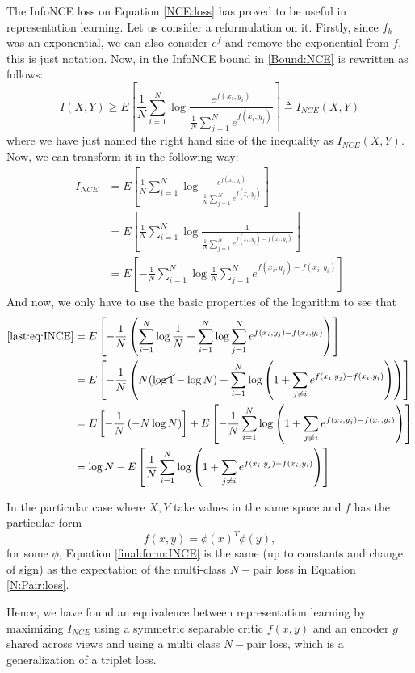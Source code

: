 The InfoNCE loss on Equation \eqref{NCE:loss} has proved to be useful in representation learning. Let us consider a reformulation on it. Firstly, since $f_k$ was an exponential, we can also consider $e^f$ and remove the exponential from $f$, this is just notation. Now, in \cite{poole_variational_2019} the InfoNCE bound in \eqref{Bound:NCE} is rewritten as follows:
\[
I(X,Y) \geq E\left[ \frac{1}{N} \sum_{i = 1}^N \log \frac{e^{f(x_i,y_i)}}{\frac{1}{N}\sum_{j=1}^N e^{f(x_i,y_j)}}\right] \triangleq  I_{NCE}(X,Y)
\]
where we have just named the right hand side of the inequality as $I_{NCE}(X,Y)$. Now, we can transform it in the following way:
\begin{align}
I_{NCE}  & = E\left[ \frac{1}{N} \sum_{i = 1}^N \log \frac{e^{f(x_i,y_i)}}{\frac{1}{N}\sum_{j=1}^N e^{f(x_i,y_j)}}\right]\nonumber \\
& = E\left[ \frac{1}{N} \sum_{i = 1}^N \log \frac{1}{\frac{1}{N}\sum_{j=1}^N e^{f(x_i,y_j) - f(x_i,y_i)}}\right]\nonumber \\
& = E\left[ -  \frac{1}{N} \sum_{i = 1}^N \log \frac{1}{N} \sum_{j=1}^N e^{f(x_i,y_j) - f(x_i,y_i)}\right] \label{last:eq:INCE}
\end{align}
And now, we only have to use the basic properties of the logarithm to see that
\begin{align}
\text{\eqref{last:eq:INCE}} & = E\left[-\frac{1}{N}\left(\sum_{i=1}^N \log \frac{1}{N} + \sum_{i=1}^N \log \sum_{j = 1}^N e^{f(x_i,y_j) - f(x_i,y_i)} \right)\right] \nonumber \\
& = E\left[-\frac{1}{N}\left( N(\cancel{\log 1} - \log N ) + \sum_{i=1}^N \log \left( 1  + \sum_{j \neq i} e^{f(x_i,y_j) - f(x_i,y_i)} \right)\right)\right] \nonumber\\ 
& = E\left[-\frac{1}{N}\left(-N\log N\right)\right] + E\left[-\frac{1}{N}\sum_{i=1}^N \log \left( 1  + \sum_{j \neq i} e^{f(x_i,y_j) - f(x_i,y_i)} \right)\right] \nonumber \\
& = \log N - E\left[ \frac{1}{N} \sum_{i=1}^N \log \left( 1+ \sum_{j\neq i}e^{f(x_i,y_j)- f(x_i,y_i)}\right)\right] \label{final:form:INCE}
\end{align}

In the particular case where $X,Y$ take values in the same space and $f$ has the particular form 
\[
f(x,y) = \phi(x)^T \phi(y),  
\]
for some $\phi$, Equation \eqref{final:form:INCE} is the same (up to constants and change of sign) as the expectation of the multi-class $N-$pair loss in Equation \eqref{N:Pair:loss}.

Hence, we have found an equivalence between representation learning by maximizing $I_{NCE}$ using a symmetric separable critic $f(x,y)$ and an encoder $g$ shared across views and using a multi class $N-$pair loss, which is a generalization of a triplet loss.


